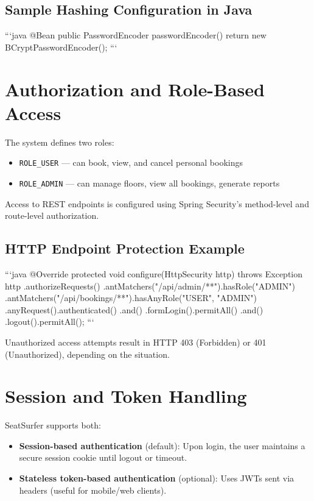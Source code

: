 \documentclass[12pt,a4paper]{report}
\begin{document}
\subsection*{Sample Hashing Configuration in Java}

```java
@Bean
public PasswordEncoder passwordEncoder() {
    return new BCryptPasswordEncoder();
}
```

\section{Authorization and Role-Based Access}

The system defines two roles:
\begin{itemize}
    \item \verb|ROLE_USER| — can book, view, and cancel personal bookings
    \item \verb|ROLE_ADMIN| — can manage floors, view all bookings, generate reports
\end{itemize}

Access to REST endpoints is configured using Spring Security’s method-level and route-level authorization.

\subsection*{HTTP Endpoint Protection Example}

```java
@Override
protected void configure(HttpSecurity http) throws Exception {
    http
        .authorizeRequests()
        .antMatchers("/api/admin/**").hasRole("ADMIN")
        .antMatchers("/api/bookings/**").hasAnyRole("USER", "ADMIN")
        .anyRequest().authenticated()
        .and()
        .formLogin().permitAll()
        .and()
        .logout().permitAll();
}
```

Unauthorized access attempts result in HTTP 403 (Forbidden) or 401 (Unauthorized), depending on the situation.

\section{Session and Token Handling}

SeatSurfer supports both:
\begin{itemize}
    \item \textbf{Session-based authentication} (default): Upon login, the user maintains a secure session cookie until logout or timeout.
    \item \textbf{Stateless token-based authentication} (optional): Uses JWTs sent via headers (useful for mobile/web clients).
\end{itemize}
\end{document}
